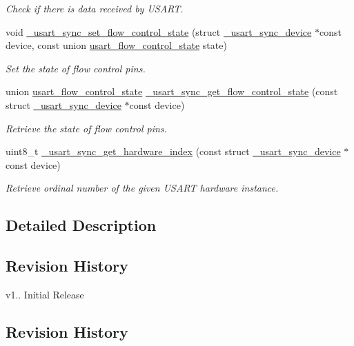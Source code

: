 \begin{DoxyCompactItemize}
\begin{DoxyCompactList}\small\item\em Check if there is data received by U\+S\+A\+RT. \end{DoxyCompactList}\item 
void \hyperlink{group___h_p_l_gae43bb6755eb8c462a9884e6cdca602aa}{\+\_\+usart\+\_\+sync\+\_\+set\+\_\+flow\+\_\+control\+\_\+state} (struct \hyperlink{struct__usart__sync__device}{\+\_\+usart\+\_\+sync\+\_\+device} $\ast$const device, const union \hyperlink{unionusart__flow__control__state}{usart\+\_\+flow\+\_\+control\+\_\+state} state)
\begin{DoxyCompactList}\small\item\em Set the state of flow control pins. \end{DoxyCompactList}\item 
union \hyperlink{unionusart__flow__control__state}{usart\+\_\+flow\+\_\+control\+\_\+state} \hyperlink{group___h_p_l_ga5b6662f283d7a2791c7eed77635e9238}{\+\_\+usart\+\_\+sync\+\_\+get\+\_\+flow\+\_\+control\+\_\+state} (const struct \hyperlink{struct__usart__sync__device}{\+\_\+usart\+\_\+sync\+\_\+device} $\ast$const device)
\begin{DoxyCompactList}\small\item\em Retrieve the state of flow control pins. \end{DoxyCompactList}\item 
uint8\+\_\+t \hyperlink{group___h_p_l_ga8fd6539ded0699161df00f23ba6580aa}{\+\_\+usart\+\_\+sync\+\_\+get\+\_\+hardware\+\_\+index} (const struct \hyperlink{struct__usart__sync__device}{\+\_\+usart\+\_\+sync\+\_\+device} $\ast$const device)
\begin{DoxyCompactList}\small\item\em Retrieve ordinal number of the given U\+S\+A\+RT hardware instance. \end{DoxyCompactList}\end{DoxyCompactItemize}


\subsection{Detailed Description}
\hypertarget{group___h_p_l_hpl_core_rev}{}\subsection{Revision History}\label{group___h_p_l_hpl_core_rev}

\begin{DoxyItemize}
\item v1.. Initial Release
\end{DoxyItemize}\hypertarget{group___h_p_l_hpl_delay_rev}{}\subsection{Revision History}\label{group___h_p_l_hpl_delay_rev}

